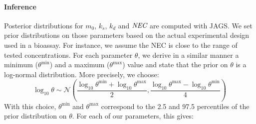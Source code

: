 \documentclass{article}
\begin{document}
\paragraph{Inference} Posterior distributions for $m_0$, $k_s$, $k_d$ and
$\mbox{\it NEC}$ are computed with JAGS. We set prior distributions on those
parameters based on the actual experimental design used in a
bioassay. For instance, we assume the NEC is close to the range of
tested concentrations. For each parameter $\theta$, we derive in a similar
manner a minimum ($\theta^{\min}$) and a maximum ($\theta^{\max}$)
value and state that the prior on $\theta$ is a log-normal
distribution. More precisely, we choose:
$$
\log_{10} \theta \sim \mathcal{N}(\frac{\log_{10} \theta^{\min} + \log_{10} \theta^{\max}}{2},
                                 \frac{\log_{10} \theta^{\max} - \log_{10} \theta^{\min}}{4})
$$
With this choice, $\theta^{\min}$ and $\theta^{\max}$ correspond to the
2.5 and 97.5 percentiles of the prior distribution on $\theta$. For
each of our parameters, this gives:
\end{document}
